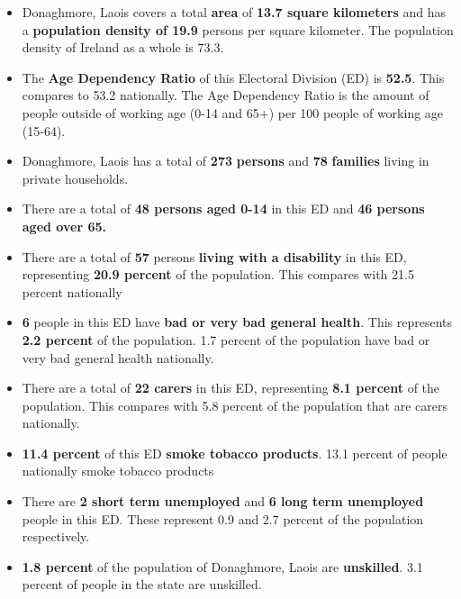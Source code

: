 \documentclass{article}
\begin{document}
\begin{itemize}

\item Donaghmore, Laois covers a total \textbf{area} of  \textbf{13.7 square kilometers} and has a \textbf{population density of 19.9} persons per square kilometer. The population density of Ireland as a whole is  73.3. 

\item The \textbf{Age Dependency Ratio} of this Electoral Division (ED) is  \textbf{52.5}. This compares to 53.2 nationally. The Age Dependency Ratio is the amount of people outside of working age (0-14 and 65+) per 100 people of working age (15-64). 

\item Donaghmore, Laois has a total of \textbf{273} \textbf{persons} and  \textbf{78} \textbf{families} living in private households.

\item There are a total of \textbf{48 persons aged 0-14} in this ED and \textbf{46 persons aged over 65.} 

\item There are a total of \textbf{57} persons \textbf{living with a disability} in this ED, representing \textbf{20.9 percent} of the population. This compares with  21.5 percent nationally

\item \textbf{6} people in this ED have \textbf{bad or very bad general health}. This represents \textbf{2.2 percent} of the population. 1.7 percent of the population have bad or very bad general health nationally. 

\item There are a total of \textbf{22 carers} in this ED, representing \textbf{8.1 percent} of the population. This compares with 5.8 percent of the population that are carers nationally. 

\item \textbf{11.4 percent} of this ED \textbf{smoke tobacco products}. 13.1 percent of people nationally smoke tobacco products

\item There are \textbf{2 short term unemployed} and \textbf{6 long term unemployed} people in this ED. These represent 0.9 and 2.7 percent of the population respectively.

\item  \textbf{1.8 percent} of the population of Donaghmore, Laois are \textbf{unskilled}. 3.1 percent of people in the state are unskilled.


\end{itemize}
\end{document}
